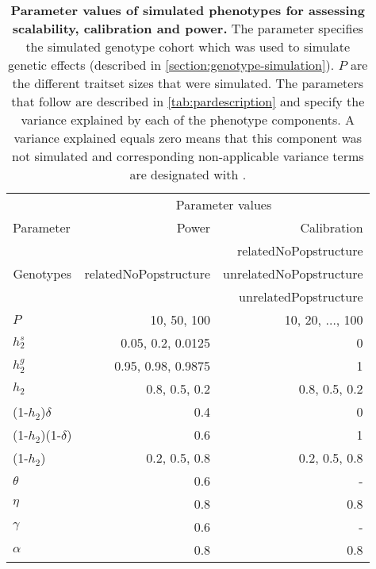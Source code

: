 \begin{table}[htbp]
  \centering
  \caption[\textbf{Parameter values of simulated phenotypes for assessing scalability, calibration and power.}]{\textbf{Parameter values of simulated phenotypes for assessing scalability, calibration and power.} The  parameter specifies the simulated genotype cohort which was used to simulate genetic effects (described in \cref{section:genotype-simulation}). \(P\) are the different traitset sizes that were simulated. The parameters that follow are described in \cref{tab:pardescription} and specify the variance explained by each of the phenotype components. A variance explained equals zero means that this component was not simulated and corresponding non-applicable variance terms are designated with \textquote{-}.} 
    \begin{tabular}{lrr}
    \toprule
          & \multicolumn{2}{c}{Parameter values} \\
\cmidrule{2-3}    Parameter & Power  & Calibration \\
    \midrule
    \multicolumn{1}{c}{\multirow{3}[1]{*}{Genotypes}} & \multicolumn{1}{c}{\multirow{3}[1]{*}{relatedNoPopstructure}} & relatedNoPopstructure \\
          &       & unrelatedNoPopstructure \\
          &       & unrelatedPopstructure \\
          \addlinespace[1.5ex]
    \(P\) & 10, 50, 100 & 10, 20, \(\ldots\), 100 \\
   \addlinespace[1.5ex]
    \(h_2^s\) & 0.05, 0.2, 0.0125 & 0 \\
    \(h_2^g\) & 0.95, 0.98, 0.9875 & 1 \\
    \(h_2\) & 0.8, 0.5, 0.2 & 0.8, 0.5, 0.2 \\
    (1-\(h_2\))\(\delta\) & 0.4 & 0 \\
    (1-\(h_2\))(1-\(\delta\)) & 0.6 & 1 \\
    (1-\(h_2\)) & 0.2, 0.5, 0.8 & 0.2, 0.5, 0.8 \\
    \(\theta\) & 0.6   &  - \\
    \(\eta\) & 0.8   & 0.8 \\
    \(\gamma\) & 0.6   &  - \\
    \(\alpha\) & 0.8   & 0.8 \\
    \bottomrule
    \end{tabular}%
\label{tab:parvalues}%
\end{table}%
%
